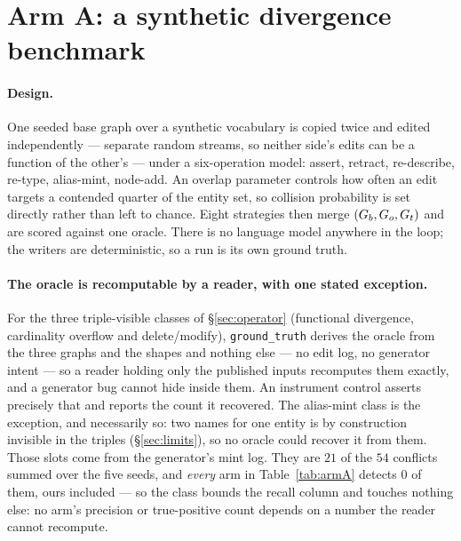 \section{Arm A: a synthetic divergence benchmark}
\label{sec:synthetic}

\paragraph{Design.} One seeded base graph over a synthetic vocabulary is copied
twice and edited independently --- separate random streams, so neither side's
edits can be a function of the other's --- under a six-operation model: assert,
retract, re-describe, re-type, alias-mint, node-add. An overlap parameter
controls how often an edit targets a contended quarter of the entity set, so
collision probability is set directly rather than left to chance. Eight
strategies then merge $(G_{b}, G_{o}, G_{t})$ and are scored against one
oracle. There is no language model anywhere in the loop; the writers are
deterministic, so a run is its own ground truth.

\paragraph{The oracle is recomputable by a reader, with one stated exception.}
For the three triple-visible classes of \S\ref{sec:operator} (functional
divergence, cardinality overflow and delete/modify), \texttt{ground\_truth} derives the oracle
from the three graphs and the shapes and nothing else --- no edit log, no
generator intent --- so a reader holding only the published inputs recomputes
them exactly, and a generator bug cannot hide inside them. An instrument control
asserts precisely that and reports the count it recovered. The alias-mint class
is the exception, and necessarily so: two names for one entity is by
construction invisible in the triples (\S\ref{sec:limits}), so no oracle could
recover it from them. Those slots come from the generator's mint log. They are
$21$ of the $54$ conflicts summed over the five seeds, and \emph{every} arm in
Table~\ref{tab:armA} detects $0$ of them, ours included --- so the class bounds
the recall column and touches nothing else: no arm's precision or
true-positive count depends on a number the reader cannot recompute.


